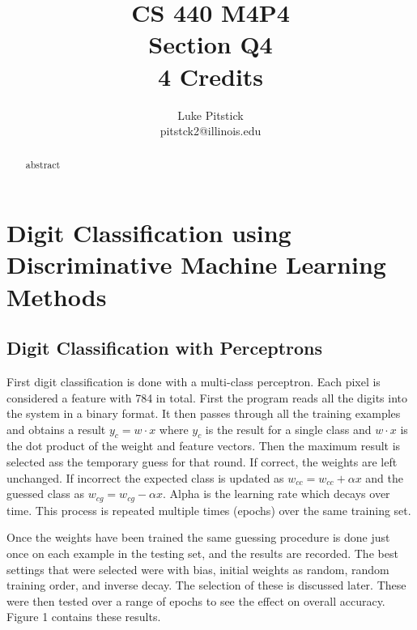 \documentclass{article}[12pt]
\title{CS 440 M4P4\\ Section Q4 \\ 4 Credits}
\author{
Luke Pitstick \\ pitstck2@illinois.edu
}
\date{} %
\begin{document}
   
   \maketitle
   \begin{abstract}
abstract
   \end{abstract}
   \newpage

   
   \section{Digit Classification using Discriminative Machine Learning Methods} \label{sec:one}
   
   \subsection{Digit Classification with Perceptrons}
   
   First digit classification is done with a multi-class perceptron. Each pixel is considered a feature with 784 in total. First the program reads all the digits into the system in a binary format. It then passes through all the training examples and obtains a result $y_c = w \cdot x$ where $y_c$ is the result for a single class and $w\cdot x$ is the dot product of the weight and feature vectors. Then the maximum result is selected ass the temporary guess for that round. If correct, the weights are left unchanged. If incorrect the expected class is updated as $w_{cc} = w_{cc} + \alpha x$ and the guessed class as $w_{cg} = w_{cg} - \alpha x$. Alpha is the learning rate which decays over time. This process is repeated multiple times (epochs) over the same training set.
   
   Once the weights have been trained the same guessing procedure is done just once on each example in the testing set, and the results are recorded. The best settings that were selected were with bias, initial weights as random, random training order, and inverse decay. The selection of these is discussed later. These were then tested over a range of epochs to see the effect on overall accuracy. Figure 1 contains these results.
   
\end{document}
